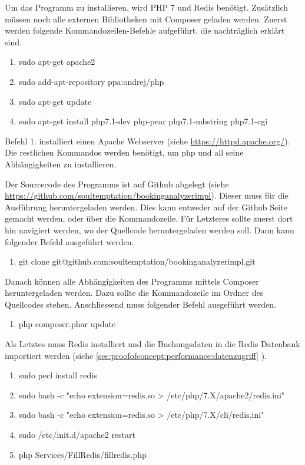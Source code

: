 Um das Programm zu installieren, wird PHP 7 und Redis benötigt. Zusätzlich müssen noch alle externen Bibliotheken mit Composer geladen werden. Zuerst werden folgende Kommandozeilen-Befehle aufgeführt, die nachträglich erklärt sind. 

\begin{enumerate}
\item sudo apt-get apache2
\item sudo add-apt-repository ppa:ondrej/php
\item sudo apt-get update
\item sudo apt-get install php7.1-dev php-pear php7.1-mbstring php7.1-cgi
\end{enumerate}
Befehl 1. installiert einen Apache Webserver (siehe \url{https://httpd.apache.org/}). Die restlichen Kommandos werden benötigt, um \gls{php} und all seine Abhängigkeiten zu installieren. 

Der Sourcecode des Programms ist auf Github abgelegt (siehe \url{https://github.com/soultemptation/bookinganalyzerimpl}). Dieser muss für die Ausführung heruntergeladen werden. Dies kann entweder auf der Github Seite gemacht werden, oder über die Kommandozeile. Für Letzteres sollte zuerst dort hin navigiert werden, wo der Quellcode heruntergeladen werden soll. Dann kann folgender Befehl ausgeführt werden.
\begin{enumerate}[resume]
\item git clone git@github.com:soultemptation/bookinganalyzerimpl.git
\end{enumerate}

Danach können alle Abhängigkeiten des Programms mittels Composer heruntergeladen werden. Dazu sollte die Kommandozeile im Ordner des Quellcodes stehen. Anschliessend muss folgender Befehl ausgeführt werden.
\begin{enumerate}[resume]
\item php composer.phar update
\end{enumerate}

Als Letztes muss Redis installiert und die Buchungsdaten in die Redis Datenbank importiert werden (siehe \cref{sec:proofofconcept:performance:datenzugriff} ).

\begin{enumerate}[resume]
\item sudo pecl install redis
\item sudo bash -c "echo extension=redis.so > /etc/php/7.X/apache2/redis.ini"
\item sudo bash -c "echo extension=redis.so > /etc/php/7.X/cli/redis.ini"
\item sudo /etc/init.d/apache2 restart
\item php Services/FillRedis/fillredis.php
\end{enumerate}

